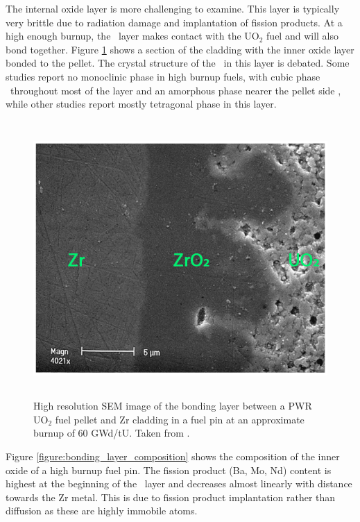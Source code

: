The internal oxide layer is more challenging to examine. This layer is typically very brittle due to radiation damage and implantation of fission products. At a high enough burnup, the \zirconia\ layer makes contact with the UO$_{2}$ fuel and will also bond together. Figure \ref{figure:inner_oxide} shows a section of the cladding with the inner oxide layer bonded to the pellet. The crystal structure of the \zirconia\ in this layer is debated. Some studies report no monoclinic phase in high burnup fuels, with cubic phase \zirconia\ throughout most of the layer and an amorphous phase nearer the pellet side \cite{Nogita1997}, while other studies report mostly tetragonal phase in this layer. 

\begin{figure}[htp]
\centering
\includegraphics[height=10.5cm]{images/pci_bondinglayer.png}
\caption[High resolution SEM image of the bonding layer between a PWR UO$_{2}$ fuel pellet and Zr cladding in a fuel pin at an approximate burnup of 60 GWd/tU.]{High resolution SEM image of the bonding layer between a PWR UO$_{2}$ fuel pellet and Zr cladding in a fuel pin at an approximate burnup of 60 GWd/tU. Taken from \cite{Lozano1998}.}
\label{figure:inner_oxide}
\end{figure}

Figure \ref{figure:bonding_layer_composition} shows the composition of the inner oxide of a high burnup fuel pin. The fission product (Ba, Mo, Nd) content is highest at the beginning of the \zirconia\ layer and decreases almost linearly with distance towards the Zr metal. This is due to fission product implantation rather than diffusion as these are highly immobile atoms. %

